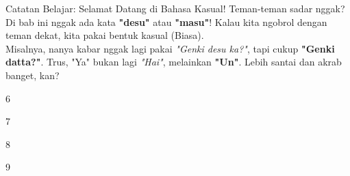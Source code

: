 \begin{lessonbox}{Catatan Belajar: Selamat Datang di Bahasa Kasual!}
    Teman-teman sadar nggak? Di bab ini nggak ada kata \textbf{"desu"} atau \textbf{"masu"}! Kalau kita ngobrol dengan teman dekat, kita pakai bentuk kasual (Biasa).\\
    
    Misalnya, nanya kabar nggak lagi pakai \textit{"Genki desu ka?"}, tapi cukup \textbf{"Genki datta?"}. Trus, "Ya" bukan lagi \textit{"Hai"}, melainkan \textbf{"Un"}. Lebih santai dan akrab banget, kan?
\end{lessonbox}

\begin{convobox}{6}
    \noindent
      

    \vspace{1.5em}
\end{convobox}

\begin{convobox}{7}
    \noindent
      

    \vspace{1.5em}
\end{convobox}

\begin{convobox}{8}
    \noindent

    \vspace{1.5em}
\end{convobox}

\begin{convobox}{9}
    \noindent
      

    \vspace{1.5em}
\end{convobox}

